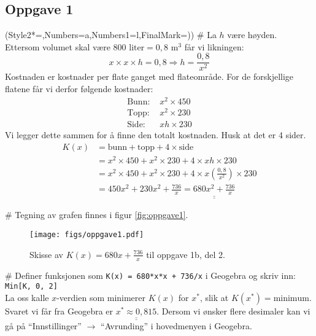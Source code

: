 \documentclass[12pt, a4paper]
{article}						%
\def\answer#1{\underline{\underline{#1}}}
\begin{document}
	\subsection*{Oppgave 1}
	\begin{easylist}[enumerate]
		\ListProperties(Style2*=,Numbers=a,Numbers1=l,FinalMark={)})
		# La $h$ være høyden. Ettersom volumet skal være $800 \text{ liter} = 0,8 \text{ m}^3$ får vi likningen:
		\begin{equation*}
		x \times x \times h = 0,8 \Rightarrow h = \frac{0,8}{x^2}
		\end{equation*}
		Kostnaden er kostnader per flate ganget med flateområde. For de forskjellige flatene får vi derfor følgende kostnader:
		\begin{align*}
		\text{Bunn: }& x^2 \times 450 \\
		\text{Topp: }& x^2 \times 230 \\
		\text{Side: }& xh \times 230 
		\end{align*}
		Vi legger dette sammen for å finne den totalt kostnaden. Husk at det er 4 sider. 
		\begin{align*}
		K(x) &= \text{bunn} + \text{topp} + 4 \times \text{side} \\ 
		&= x^2 \times 450 + x^2 \times 230 + 4 \times xh \times 230 \\ 
		&= x^2 \times 450 + x^2 \times 230 + 4 \times x\left(\frac{0,8}{x^2}\right) \times 230 \\ 
		&= 450x^2 + 230 x^2 + \frac{736}{x} = \answer{680 x^2 + \frac{736}{x}}
		\end{align*}
		
		# Tegning av grafen finnes i figur \eqref{fig:oppgave1}.
		\begin{figure}[th!]
			\centering
			\texttt{[image: figs/oppgave1.pdf]}
			\caption{Skisse av $K(x) = 680x + \frac{736}{x}$ til oppgave 1b, del 2.}
			\label{fig:oppgave1}
		\end{figure}
		
		# Definer funksjonen som \texttt{K(x) = 680*x*x + 736/x} i Geogebra og skriv inn:\\
		\texttt{Min[K, 0, 2]} \\
		La oss kalle $x$-verdien som minimerer $K(x)$ for $x^*$, slik at $K(x^*) = \text{minimum}$.
		Svaret vi får fra Geogebra er $\answer{x^* \approx 0,815}$. Dersom vi ønsker flere desimaler kan vi gå på ``Innstillinger'' $\rightarrow$ ``Avrunding'' i hovedmenyen i Geogebra.
	\end{easylist}
	
\end{document}
